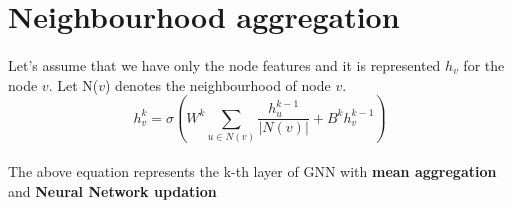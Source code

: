 \section{Neighbourhood aggregation}
    \paragraph{} Let's assume that we have only the node features and it is represented $h_{v}$ for the node $v$. Let N($v$) denotes the neighbourhood of node $v$.
    \begin{equation}
        h_{v}^k = \sigma(W^k\sum_{u \in N(v)}\frac{h_u^{k-1}}{|N(v)|}+B^k h_{v}^{k-1})
    \end{equation}
    \paragraph{} The above equation represents the k-th layer of GNN with \textbf{mean aggregation} and \textbf{Neural Network updation}

